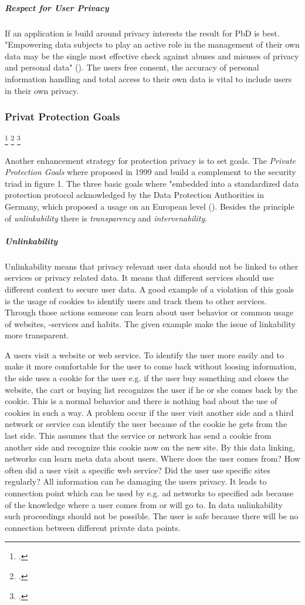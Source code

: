 \subparagraph{Respect for User Privacy}
If an application is build around privacy interests the result for PbD is best. "Empowering data subjects to play an active role in the management of their own data may be the single most effective check against abuses and misuses of privacy and personal data" (\cite{cavoukian2009privacy}). The users free consent, the accuracy of personal information handling and total access to their own data is vital to include users in their own privacy.


\subsubsection{Privat Protection Goals} 
\footcite{hansen2012top} 
\footcite{rost2009datenschutz}
\footcite{probst2012generische}

Another enhancement strategy for protection privacy is to set goals. The \textit{Private Protection Goals} where proposed in 1999 and build a complement to the security triad in figure 1. The three basic goals where "embedded into a standardized data protection protocol acknowledged by the Data Protection Authorities in Germany, which proposed a usage on an European level (\cite{danezis2015privacy}). Besides the principle of \textit{unlinkability} there is \textit{transparency} and \textit{intervenability}. 

\subparagraph{Unlinkability}
Unlinkability means that privacy relevant user data should not be linked to other services or privacy related data. It means that different services should use different context to secure user data. A good example of a violation of this goals is the usage of cookies to identify users and track them to other services. Through those actions someone can learn about user behavior or common usage of websites, -services and habits. The given example make the issue of linkability more transparent.

A users visit a website or web service. To identify the user more easily and to make it more comfortable for the user to come back without loosing information, the side uses a cookie for the user e.g. if the user buy something and closes the website, the cart or buying list recognizes the user if he or she comes back by the cookie. This is a normal behavior and there is nothing bad about the use of cookies in such a way. A problem occur if the user visit another side and a third network or service can identify the user because of the cookie he gets from the last side. This assumes that the service or network has send a cookie from another side and recognize this cookie now on the new site. By this data linking, networks can learn meta data about users. Where does the user comes from? How often did a user visit a specific web service? Did the user use specific sites regularly? All information can be damaging the users privacy. It leads to connection point which can be used by e.g. ad networks to specified ads because of the knowledge where a user comes from or will go to. In data unlinkability such proceedings should not be possible. The user is safe because there will be no connection between different private data points.

